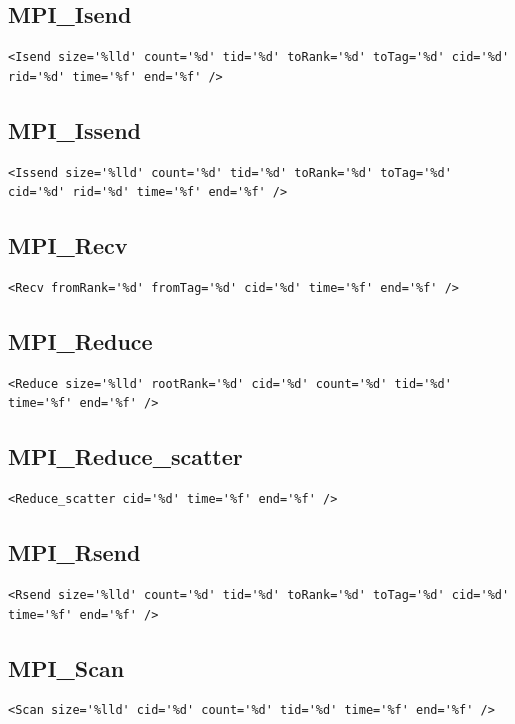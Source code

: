 \documentclass[a4paper,12pt,pdftex]{scrartcl}
\begin{document}
\subsection{MPI\_Isend}
\begin{lstlisting}
<Isend size='%lld' count='%d' tid='%d' toRank='%d' toTag='%d' cid='%d' rid='%d' time='%f' end='%f' />
\end{lstlisting}

\subsection{MPI\_Issend}
\begin{lstlisting}
<Issend size='%lld' count='%d' tid='%d' toRank='%d' toTag='%d' cid='%d' rid='%d' time='%f' end='%f' />
\end{lstlisting}

\subsection{MPI\_Recv}
\begin{lstlisting}
<Recv fromRank='%d' fromTag='%d' cid='%d' time='%f' end='%f' />
\end{lstlisting}

\subsection{MPI\_Reduce}
\begin{lstlisting}
<Reduce size='%lld' rootRank='%d' cid='%d' count='%d' tid='%d' time='%f' end='%f' />
\end{lstlisting}

\subsection{MPI\_Reduce\_scatter}
\begin{lstlisting}
<Reduce_scatter cid='%d' time='%f' end='%f' />
\end{lstlisting}

\subsection{MPI\_Rsend}
\begin{lstlisting}
<Rsend size='%lld' count='%d' tid='%d' toRank='%d' toTag='%d' cid='%d' time='%f' end='%f' />
\end{lstlisting}

\subsection{MPI\_Scan}
\begin{lstlisting}
<Scan size='%lld' cid='%d' count='%d' tid='%d' time='%f' end='%f' />
\end{lstlisting}
\end{document}
